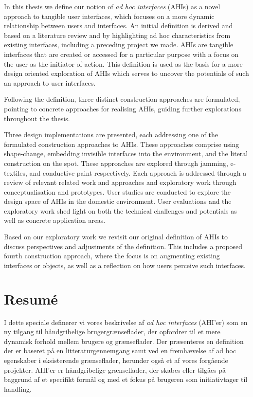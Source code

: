 
In this thesis we define our notion of \emph{ad hoc interfaces} (AHIs) as a novel approach to tangible user interfaces, which focuses on a more dynamic relationship between users and interfaces.
An initial definition is derived and based on a literature review and by highlighting ad hoc characteristics from existing interfaces, including a preceding project we made.
AHIs are tangible interfaces that are created or accessed for a particular purpose with a focus on the user as the initiator of action.
This definition is used as the basis for a more design oriented exploration of AHIs which serves to uncover the potentials of such an approach to user interfaces.

Following the definition, three distinct construction approaches are formulated, pointing to concrete approaches for realising AHIs, guiding further explorations throughout the thesis.

Three design implementations are presented, each addressing one of the formulated construction approaches to AHIs.
These approaches comprise using shape-change, embedding invisible interfaces into the environment, and the literal construction on the spot.
These approaches are explored through jamming, e-textiles, and conductive paint respectively. 
Each approach is addressed through a review of relevant related work and approaches and exploratory work through conceptualisation and prototypes.
User studies are conducted to explore the design space of AHIs in the domestic environment.
User evaluations and the exploratory work shed light on both the technical challenges and potentials as well as concrete application areas.

Based on our exploratory work we revisit our original definition of AHIs to discuss perspectives and adjustments of the definition.
This includes a proposed fourth construction approach, where the focus is on augmenting existing interfaces or objects, as well as a reflection on how users perceive such interfaces.

\chapter*{Resum\'e}

I dette speciale definerer vi vores beskrivelse af \emph{ad hoc interfaces} (AHI'er) som en ny tilgang til håndgribelige brugergrænseflader, der opfordrer til et mere dynamisk forhold mellem brugere og grænseflader.
Der præsenteres en definition der er baseret på en litteraturgennemgang samt ved en fremhævelse af ad hoc egenskaber i eksisterende grænseflader, herunder også et af vores forgående projekter.
AHI'er er håndgribelige grænseflader, der skabes eller tilgåes på baggrund af et specifikt formål og med et fokus på brugeren som initiativtager til handling.

